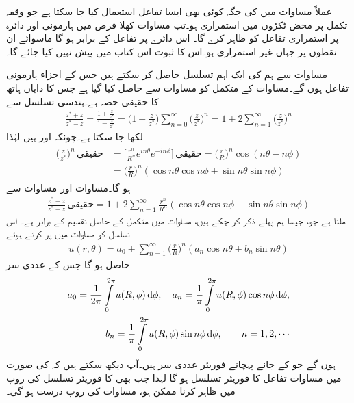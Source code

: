 عملاً مساوات  میں  کی جگہ کوئی بھی ایسا تفاعل استعمال کیا جا سکتا ہے جو وقفہ تکمل پر محض ٹکڑوں میں استمراری ہو۔تب مساوات  کھلا قرص  میں  ہارمونی اور دائرہ  پر استمراری  تفاعل  کو ظاہر کرے گا۔ اس دائرے پر تفاعل  کے برابر ہو گا ماسوائے ان نقطوں پر جہاں  غیر استمراری ہو۔اس کا ثبوت اس کتاب میں پیش نہیں کیا جائے گا۔

مساوات  سے ہم  کی ایک اہم تسلسل حاصل کر سکتے ہیں جس کے اجزاء ہارمونی تفاعل ہوں گے۔مساوات  کے متکمل کو مساوات   سے حاصل کیا گیا ہے جس کا دایاں ہاتھ   کا حقیقی حصہ ہے۔ہندسی تسلسل سے
\begin{align}\label{مساوات_مخفی_معمہ_ث}
\frac{z^*+z}{z^*-z}=\frac{1+\frac{z}{z^*}}{1-\frac{z}{z^*}}=\big(1+\frac{z}{z^*}\big)\sum_{n=0}^{\infty}\big(\frac{z}{z^*}\big)^{\!\!n}=1+2\sum_{n=1}^{\infty}\big(\frac{z}{z^*}\big)^{\!\!n}
\end{align} 
لکھا جا سکتا ہے۔چونکہ  اور  ہیں لہٰذا 
\begin{gather}
\begin{aligned}\label{مساوات_مخفی_معمہ_ج}
\big(\frac{z}{z^*}\big)^{\!\!n}\,\text{حقیقی} &=\big[\frac{r^n}{R^n}e^{in\theta}e^{-in\phi}\big]\,\text{حقیقی}=\big(\frac{r}{R}\big)^{\!\!n}\cos(n\theta-n\phi)\\
&=\big(\frac{r}{R}\big)^{\!\!n}(\cos n\theta\cos n\phi+\sin n\theta\sin n \phi)
\end{aligned}
\end{gather}
ہو گا۔مساوات  اور مساوات  سے
\begin{align*}
\frac{z^*+z}{z^*-z}\,\text{حقیقی}=1+2\sum_{n=1}^{\infty}\frac{r^n}{R^n}(\cos n\theta \cos n\phi+\sin n\theta\sin n\phi)
\end{align*}
ملتا ہے جو، جیسا ہم پہلے ذکر کر چکے ہیں، مساوات  میں متکمل کے حاصل تقسیم کے برابر ہے۔ اس تسلسل کو مساوات  میں پر کرتے ہوئے 
\begin{align}\label{مساوات_مخفی_معمہ_چ}
u(r,\theta)=a_0+\sum_{n=1}^{\infty} \big(\frac{r}{R}\big)^{\!\!n}(a_n\cos n\theta+b_n\sin n \theta)
\end{align}
حاصل ہو گا جس کے عددی سر
\begin{gather}
\begin{aligned}\label{مساوات_مخفی_معمہ_ح}
a_0=\frac{1}{2\pi}\int\limits_{0}^{2\pi}u(R,\phi)\dif \phi,\quad  a_n=\frac{1}{\pi}\int\limits_{0}^{2\pi}u(R,\phi)\cos n\phi \dif \phi,\\
b_n=\frac{1}{\pi}\int\limits_{0}^{2\pi}u(R,\phi)\sin n\phi \dif \phi,\quad \quad n=1,2,\cdots
\end{aligned}
\end{gather}
ہوں گے جو  کے جانے پہچانے فوریئر عددی سر ہیں۔آپ دیکھ سکتے ہیں کہ  کی صورت میں مساوات  تفاعل  کا فوریئر تسلسل ہو گا لہٰذا جب بھی  کا فوریئر تسلسل کی روپ میں ظاہر کرنا ممکن ہو، مساوات  کی روپ درست ہو گی۔ 

